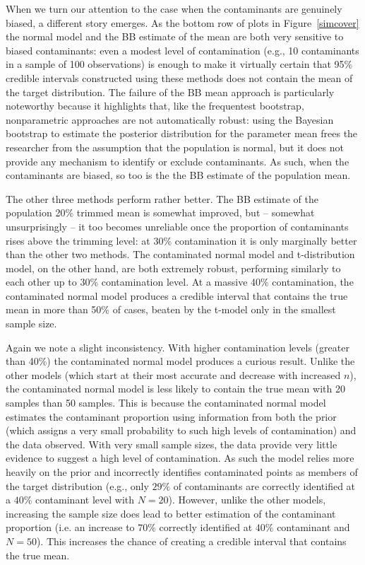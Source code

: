\documentclass[doc]{apa6}
\begin{document}
{When we turn our attention to the case when the contaminants are genuinely biased, a different story emerges. As the bottom row of plots in Figure~\ref{simcover} the normal model and the BB estimate of the mean are both very sensitive to biased contaminants: even a modest level of contamination (e.g., 10 contaminants in a sample of 100 observations) is enough to make it virtually certain that 95\% credible intervals constructed using these methods does not contain the mean of the target distribution. The failure of the BB mean approach is particularly noteworthy because it highlights   that, like the frequentest bootstrap,   nonparametric approaches are not automatically robust: using the Bayesian bootstrap to estimate the posterior distribution for the parameter mean frees the researcher from the assumption that the population is normal, but it does not provide any mechanism to identify or exclude contaminants. As such, when the contaminants are biased, so too is the the BB estimate of the population mean.

The other     three   methods perform rather better. The BB estimate of the population 20\% trimmed mean is somewhat improved, but -- somewhat unsurprisingly -- it too becomes unreliable once the proportion of contaminants rises above the trimming level: at 30\% contamination it is only marginally better than the other two methods. The contaminated normal model   and t-distribution model,   on the other hand, are both extremely robust,   performing similarly to each other up to 30\% contamination level.    At a massive 40\% contamination, the contaminated normal model produces a   credible interval   that   contains the true mean in more than 50\% of cases, beaten by the t-model only in the smallest sample size.

Again we note a slight inconsistency. With higher contamination levels (greater than 40\%) the contaminated normal model produces a curious result. Unlike the other models (which start at their most accurate and decrease with increased $n$), the contaminated normal model is less     likely   to contain the true mean with 20 samples than 50 samples. This is because the contaminated normal model estimates the contaminant proportion using information from both the prior (which assigns a very small probability to such high levels of contamination) and the data observed. With very small sample sizes, the data provide very  little evidence to suggest a high level of contamination. As such the model relies more heavily on the prior and incorrectly identifies contaminated points as members of the target distribution (e.g., only $29\%$ of contaminants are correctly identified at a $40\%$ contaminant level with $N=20$). However, unlike the other models, increasing the sample size does lead to better estimation of the contaminant proportion (i.e. an increase to $70\%$ correctly identified at $40\%$ contaminant and $N=50$). This increases the chance of creating a credible interval that contains the true mean.

}
\end{document}
